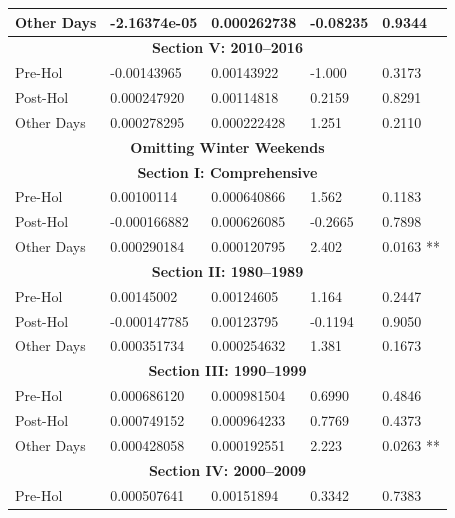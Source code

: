 \documentclass[11pt, english]{article}
\begin{document}
\begin{center}
\begin{longtable}{p{2cm}p{2cm}p{2cm}p{2cm}p{2cm}}
                Other Days & -2.16374e-05 & 0.000262738 & -0.08235 & 0.9344\\
                \hline 
                \multicolumn{5}{c}{\textbf{Section V: 2010--2016}}\\   
                \hline            
                Pre-Hol & -0.00143965 & 0.00143922 & -1.000 & 0.3173\\ 
                Post-Hol & 0.000247920 & 0.00114818 & 0.2159 & 0.8291\\  
                Other Days & 0.000278295 & 0.000222428 & 1.251 & 0.2110\\
                \hline
                \hline
                \multicolumn{5}{c}{\textbf{Omitting Winter Weekends}}\\
		\hline
                \hline
                \multicolumn{5}{c}{\textbf{Section I: Comprehensive}}\\
                \hline
                Pre-Hol & 0.00100114 & 0.000640866 & 1.562 & 0.1183\\
                Post-Hol & -0.000166882 & 0.000626085 & -0.2665 & 0.7898\\
                Other Days & 0.000290184 & 0.000120795 & 2.402 & 0.0163 **\\
                \hline
                \multicolumn{5}{c}{\textbf{Section II: 1980--1989}}\\
                \hline
                Pre-Hol & 0.00145002 & 0.00124605 & 1.164 & 0.2447\\
                Post-Hol & -0.000147785 & 0.00123795 & -0.1194 & 0.9050\\  
                Other Days & 0.000351734 & 0.000254632 & 1.381 & 0.1673\\
                \hline 
                \multicolumn{5}{c}{\textbf{Section III: 1990--1999}}\\   
                \hline            
                Pre-Hol & 0.000686120 & 0.000981504 & 0.6990 & 0.4846\\ 
                Post-Hol & 0.000749152 & 0.000964233 & 0.7769 & 0.4373\\  
                Other Days & 0.000428058 & 0.000192551 & 2.223 & 0.0263 **\\
                \hline 
                \multicolumn{5}{c}{\textbf{Section IV: 2000--2009}}\\
                \hline                                          
                Pre-Hol & 0.000507641 & 0.00151894 & 0.3342 & 0.7383\\

\end{longtable}
\end{center}
\end{document}
